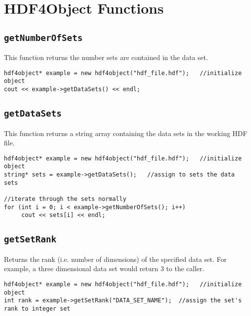 \documentclass{report}
\begin{document}
\section*{HDF4Object Functions}
\subsection*{\texttt{getNumberOfSets}}
This function returns the number sets are contained in the data set.\\
\begin{verbatim}
hdf4object* example = new hdf4object("hdf_file.hdf");   //initialize object
cout << example->getDataSets() << endl;
\end{verbatim}

\subsection*{\texttt{getDataSets}}
This function returns a string array containing the data sets in the working HDF file.\\
\begin{verbatim}
hdf4object* example = new hdf4object("hdf_file.hdf");   //initialize object
string* sets = example->getDataSets();   //assign to sets the data sets

//iterate through the sets normally
for (int i = 0; i < example->getNumberOfSets(); i++)
     cout << sets[i] << endl;
\end{verbatim}

\subsection*{\texttt{getSetRank}}
Returns the rank (i.e. number of dimensions) of the specified data set.  For example, a three dimensional data set would return 3 to the caller.\\
\begin{verbatim}
hdf4object* example = new hdf4object("hdf_file.hdf");   //initialize object
int rank = example->getSetRank("DATA_SET_NAME");  //assign the set's rank to integer set
\end{verbatim}
\end{document}
